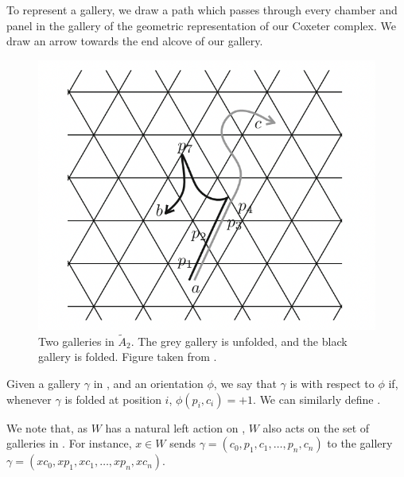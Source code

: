 \documentclass[11pt]{article}
\begin{document}
To represent a gallery, we draw a path which passes through every chamber and panel in the gallery of the geometric representation of our Coxeter complex. We draw an arrow towards the end alcove of our gallery. 

\begin{figure}[!htbp]
    \begin{center}
    \includegraphics[scale=0.4]{Screenshot 2023-04-18 at 17.03.05.png}
    \end{center}
    \caption{Two galleries in $\tilde{A}_2$. The grey gallery is unfolded, and the black gallery is folded. Figure taken from \cite[p.127]{SHA}.}
\end{figure}

\begin{definition}
    Given a gallery $\gamma$ in \sg, and an orientation $\phi$, we say that $\gamma$ is  with respect to $\phi$ if, whenever $\gamma$ is folded at position $i$, $\phi(p_i,c_i)=+1$.  We can similarly define .
\end{definition}

We note that, as $W$ has a natural left action on \sg, $W$ also acts on the set of galleries in \sg. For instance, $x\in W$ sends $\gamma = (c_0,p_1,c_1,\hdots ,p_n,c_n)$ to the gallery $\gamma = (xc_0,xp_1,xc_1,\hdots ,xp_n,xc_n)$. 

\end{document}
